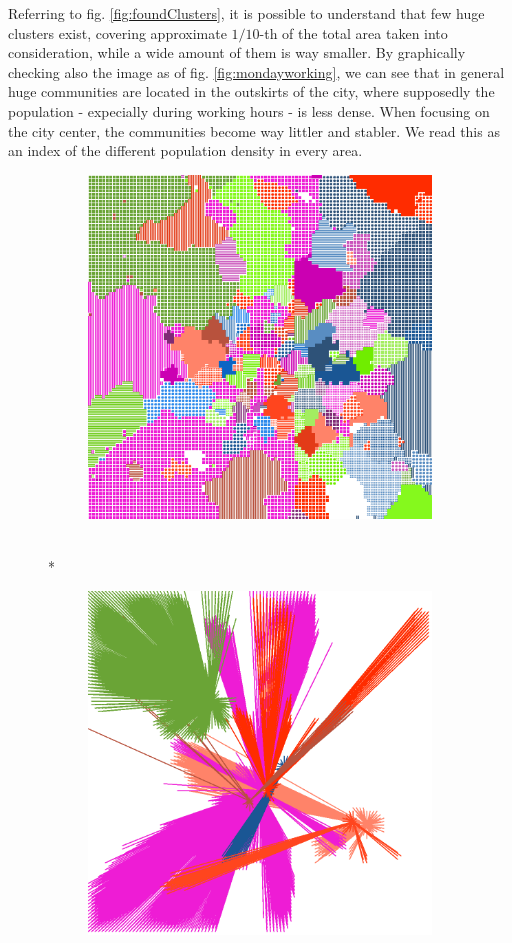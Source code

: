 \documentclass[12pt,a4paper]{article}
\begin{document}
Referring to fig. \ref{fig:foundClusters}, it is possible to understand that few huge clusters exist, covering approximate $1/10$-th of the total area taken into consideration, while a wide amount of them is way smaller.
By graphically checking also the image as of fig. \ref{fig:mondayworking}, we can see that in general huge communities are located in the outskirts of the city, where supposedly the population - expecially during working hours - is less dense. When focusing on the city center, the communities become way littler and stabler. We read this as an index of the different population density in every area.

\begin{figure}[H]
\begin{subfigure}[b]{\textwidth}
\centering
\includegraphics[width=0.8\linewidth]{weekDef/1Mon.png}
\caption{}
\end{subfigure}
\\*
\begin{subfigure}[b]{0.3\textwidth}
\includegraphics[width=\textwidth]{weekDef/edges-1Mon-big.png}

\end{subfigure}
\end{figure}
\end{document}
